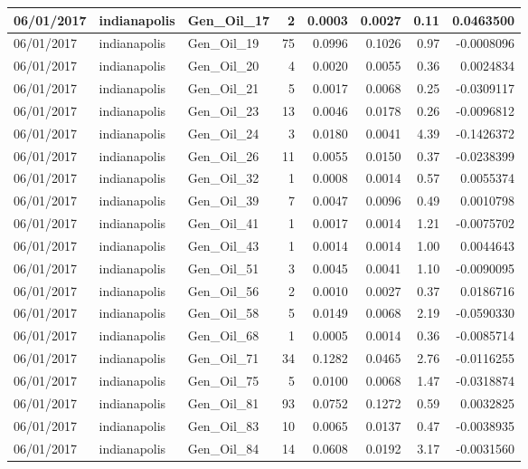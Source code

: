 \documentclass[
  letterpaper,
  DIV=11,
  numbers=noendperiod]{scrartcl}
\begin{document}
\begin{tabular}{l|l|l|r|r|r|r|r}
\hline
06/01/2017 & indianapolis & Gen\_Oil\_17 & 2 & 0.0003 & 0.0027 & 0.11 & 0.0463500\\
\hline
06/01/2017 & indianapolis & Gen\_Oil\_19 & 75 & 0.0996 & 0.1026 & 0.97 & -0.0008096\\
\hline
06/01/2017 & indianapolis & Gen\_Oil\_20 & 4 & 0.0020 & 0.0055 & 0.36 & 0.0024834\\
\hline
06/01/2017 & indianapolis & Gen\_Oil\_21 & 5 & 0.0017 & 0.0068 & 0.25 & -0.0309117\\
\hline
06/01/2017 & indianapolis & Gen\_Oil\_23 & 13 & 0.0046 & 0.0178 & 0.26 & -0.0096812\\
\hline
06/01/2017 & indianapolis & Gen\_Oil\_24 & 3 & 0.0180 & 0.0041 & 4.39 & -0.1426372\\
\hline
06/01/2017 & indianapolis & Gen\_Oil\_26 & 11 & 0.0055 & 0.0150 & 0.37 & -0.0238399\\
\hline
06/01/2017 & indianapolis & Gen\_Oil\_32 & 1 & 0.0008 & 0.0014 & 0.57 & 0.0055374\\
\hline
06/01/2017 & indianapolis & Gen\_Oil\_39 & 7 & 0.0047 & 0.0096 & 0.49 & 0.0010798\\
\hline
06/01/2017 & indianapolis & Gen\_Oil\_41 & 1 & 0.0017 & 0.0014 & 1.21 & -0.0075702\\
\hline
06/01/2017 & indianapolis & Gen\_Oil\_43 & 1 & 0.0014 & 0.0014 & 1.00 & 0.0044643\\
\hline
06/01/2017 & indianapolis & Gen\_Oil\_51 & 3 & 0.0045 & 0.0041 & 1.10 & -0.0090095\\
\hline
06/01/2017 & indianapolis & Gen\_Oil\_56 & 2 & 0.0010 & 0.0027 & 0.37 & 0.0186716\\
\hline
06/01/2017 & indianapolis & Gen\_Oil\_58 & 5 & 0.0149 & 0.0068 & 2.19 & -0.0590330\\
\hline
06/01/2017 & indianapolis & Gen\_Oil\_68 & 1 & 0.0005 & 0.0014 & 0.36 & -0.0085714\\
\hline
06/01/2017 & indianapolis & Gen\_Oil\_71 & 34 & 0.1282 & 0.0465 & 2.76 & -0.0116255\\
\hline
06/01/2017 & indianapolis & Gen\_Oil\_75 & 5 & 0.0100 & 0.0068 & 1.47 & -0.0318874\\
\hline
06/01/2017 & indianapolis & Gen\_Oil\_81 & 93 & 0.0752 & 0.1272 & 0.59 & 0.0032825\\
\hline
06/01/2017 & indianapolis & Gen\_Oil\_83 & 10 & 0.0065 & 0.0137 & 0.47 & -0.0038935\\
\hline
06/01/2017 & indianapolis & Gen\_Oil\_84 & 14 & 0.0608 & 0.0192 & 3.17 & -0.0031560\\

\end{tabular}
\end{document}
